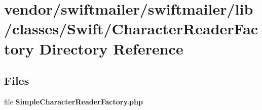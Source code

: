 \section{vendor/swiftmailer/swiftmailer/lib/classes/\+Swift/\+Character\+Reader\+Factory Directory Reference}
\label{dir_aa4841cc0da7c831871377fc4a4655db}
\subsection*{Files}
\begin{DoxyCompactItemize}
\item 
file {\bf Simple\+Character\+Reader\+Factory.\+php}
\end{DoxyCompactItemize}
